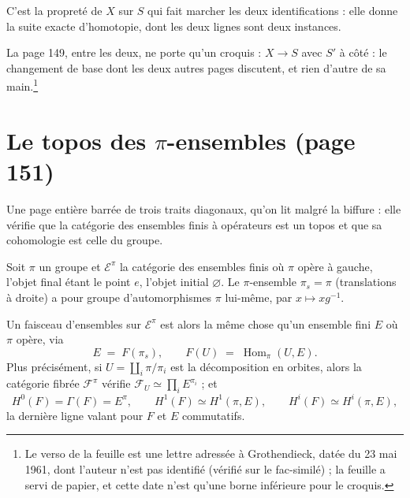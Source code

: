 \documentclass[11pt,a4paper]{article}
\begin{document}

C'est la propreté de $X$ sur $S$ qui fait marcher les deux identifications :
elle donne la suite exacte d'homotopie, dont les deux lignes sont deux
instances.

La page 149, entre les deux, ne porte qu'un croquis : $X \to S$ avec $S'$ à
côté : le changement de base dont les deux autres pages discutent, et
rien d'autre de sa main.\footnote{Le verso de la feuille est
une lettre adressée à Grothendieck, datée du 23 mai 1961, dont l'auteur n'est
pas identifié (vérifié sur le fac-similé) ; la feuille a servi de papier, et
cette date n'est qu'une borne inférieure pour le croquis.}

\section*{Le topos des $\pi$-ensembles (page 151)}

Une page entière barrée de trois traits diagonaux, qu'on lit malgré la
biffure : elle vérifie que la catégorie des ensembles finis à
opérateurs est un topos et que sa cohomologie est celle du groupe.

Soit $\pi$ un groupe et $\mathcal{E}^{\pi}$ la catégorie des ensembles finis où
$\pi$ opère à gauche, l'objet final étant le point $e$, l'objet initial
$\varnothing$. Le $\pi$-ensemble $\pi_{s} = \pi$ (translations à droite) a pour
groupe d'automorphismes $\pi$ lui-même, par $x \mapsto xg^{-1}$.

Un faisceau d'ensembles sur $\mathcal{E}^{\pi}$ est alors la même chose qu'un
ensemble fini $E$ où $\pi$ opère, via
\[
  E \;=\; F(\pi_{s}) , \qquad
  F(U) \;=\; \operatorname{Hom}_{\pi}(U, E) .
\]
Plus précisément, si $U = \coprod_{i} \pi/\pi_{i}$ est la décomposition en
orbites, alors la catégorie fibrée $\mathcal{F}^{\pi}$ vérifie
$\mathcal{F}_{U} \simeq \prod_{i} E^{\pi_{i}}$ ; et
\[
  H^{0}(F) = \Gamma(F) = E^{\pi} , \qquad
  H^{1}(F) \simeq H^{1}(\pi, E) , \qquad
  H^{i}(F) \simeq H^{i}(\pi, E) ,
\]
la dernière ligne valant pour $F$ et $E$ commutatifs.
\end{document}
